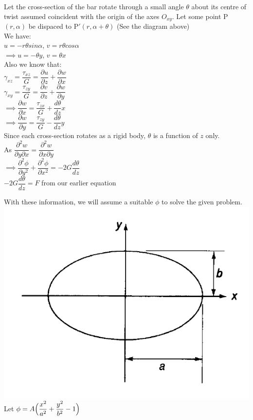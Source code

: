 \documentclass{article}
\begin{document}
\noindent Let the cross-section of the bar rotate through a small angle $\theta$ about its centre of twist assumed coincident with the origin of the axes $O_{xy}.$ Let some point P$(r,\alpha)$ be dispaced to P$'(r, \alpha+\theta)$ (See the diagram above)\\

\noindent We have: \\

\noindent $u=-r\theta sin\alpha$, $v=r\theta cos\alpha$\\
$\implies u=-\theta y$, $v=\theta x$\\

\noindent Also we know that:\\

\noindent $\gamma_{xz}=\dfrac{\tau_{xz}}{G}=\dfrac{\partial u}{\partial z}+\dfrac{\partial w}{\partial x}$\\
$\gamma_{xy}=\dfrac{\tau_{zy}}{G}=\dfrac{\partial v}{\partial z}+\dfrac{\partial w}{\partial y}$\\

\noindent $\implies \dfrac{\partial w}{\partial x}= \dfrac{\tau_{zx}}{G}+ \dfrac{d\theta}{dz}x$\\
$\implies \dfrac{\partial w}{\partial y}= \dfrac{\tau_{zy}}{G}- \dfrac{d\theta}{dz}y$\\
Since each cross-section rotates as a rigid body, $\theta$ is a function of $z$ only.\\
As $\dfrac{\partial^2 w}{\partial y \partial x}=\dfrac{\partial^2 w}{\partial x \partial y}$\\
$\implies \dfrac{\partial^2 \phi}{\partial y^2}+\dfrac{\partial^2 \phi}{\partial x^2}=-2G\dfrac{d\theta}{dz}$\\

\noindent $-2G\dfrac{d\theta}{dz}=F$ from our earlier equation \\
\newpage

\noindent With these information, we will assume a suitable $\phi$ to solve the given problem. \\
\includegraphics[scale=0.6]{4.png}\\
Let $\phi=A\Big{(}\dfrac{x^2}{a^2}+\dfrac{y^2}{b^2}-1\Big{)}$ \\
\end{document}
